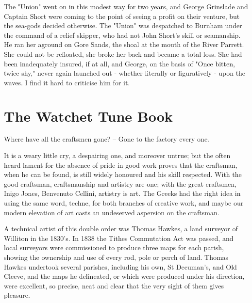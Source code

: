 The "Union" went on in this modest way for two years, and George Grinslade and	Captain Short were coming to the point of seeing a profit on their venture, but the sea-gods decided otherwise. The "Union" was	despatched to Burnham under the command of a relief skipper, who had not John Short's skill or seamanship. He ran her aground on Gore Sands, the shoal at the mouth of the River Parrett. She could not be refloated, she broke her back and became a total loss. She had been inadequately insured, if at all, and George, on the basis of "Once bitten, twice shy," never again launched out - whether literally or figuratively - upon the waves.
I find it hard to criticise him for it.
 
\section{The Watchet Tune Book}

Where have all the craftsmen gone? –
Gone to the factory every one.

It is a weary little cry, a despairing one, and moreover untrue; but the often heard lament for the absence of pride in good work proves that the craftsman, when he can be found, is still widely honoured and his skill respected. With the good craftsman, craftsmanship and artistry are one; with the great craftsmen, Inigo Jones, Benvenuto Cellini, artistry is art. The Greeks had the right idea in using the same word, techne, for both branches of creative work, and maybe our modern elevation of art casts an undeserved aspersion on the craftsman.

A technical artist of this double order was Thomas Hawkes, a land surveyor of Williton in the 1830's. In 1838 the Tithes Commutation Act was passed, and local surveyors were commissioned to produce three maps for each parish, showing the ownership and use of every rod, pole or perch of land. Thomas Hawkes undertook several parishes, including his own, St Decuman's, and Old Cleeve, and the maps he delineated, or which were produced under his direction, were excellent, so precise, neat and clear that the very sight of them gives pleasure.

